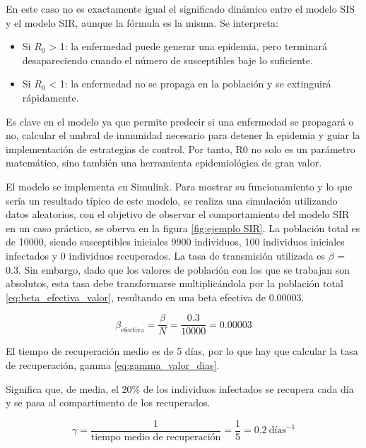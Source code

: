 En este caso no es exactamente igual el significado dinámico entre el modelo SIS y el modelo SIR, aunque la fórmula es la misma. Se interpreta:
\begin{itemize}
    \item Si $R_0$ > 1: la enfermedad puede generar una epidemia, pero terminará desapareciendo cuando el número de susceptibles baje lo suficiente.
    \item Si $R_0$ < 1: la enfermedad no se propaga en la población y se extinguirá rápidamente.
\end{itemize}

Es clave en el modelo ya que permite predecir si una enfermedad se propagará o no, calcular el umbral de inmunidad necesario para detener la epidemia y guiar la implementación de estrategias de control. Por tanto, R0 no solo es un parámetro matemático, sino también una herramienta epidemiológica de gran valor.

El modelo se implementa en Simulink. Para mostrar su funcionamiento y lo que sería un resultado típico de este modelo, se realiza una simulación utilizando datos aleatorios, con el objetivo de observar el comportamiento del modelo SIR en un caso práctico, se oberva en la figura \ref{fig:ejemplo SIR}. La población total es de 10000, siendo susceptibles iniciales 9900 individuos, 100 individuos iniciales infectados y 0 individuos recuperados.
La tasa de transmisión utilizada es $\beta$ = 0.3. Sin embargo, dado que los valores de población con los que se trabajan son absolutos, esta tasa debe transformarse multiplicándola por la población total \eqref{eq:beta_efectiva_valor}, resultando en una beta efectiva de 0.00003.

\begin{equation}
\beta_{\text{efectiva}} = \frac{\beta}{N} = \frac{0.3}{10000} = 0.00003
\label{eq:beta_efectiva_valor}
\end{equation}

El tiempo de recuperación medio es de 5 días, por lo que hay que calcular la tasa de recuperación, gamma \eqref{eq:gamma_valor_dias}.

Significa que, de media, el 20\% de los individuos infectados se recupera cada día y se pasa al compartimento de los recuperados.

\begin{equation}
\gamma = \frac{1}{\text{tiempo medio de recuperación}} = \frac{1}{5} = 0.2\ \text{días}^{-1}
\label{eq:gamma_valor_dias}
\end{equation}


